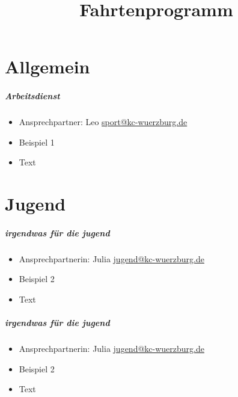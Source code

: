 \documentclass[12pt, a4paper]{report}
\title{Fahrtenprogramm}
\date{}
\begin{document}
\begingroup
    \hypersetup{hidelinks}
    \tableofcontents\thispagestyle{fancy}
\endgroup
\reversemarginpar

\chapter*{Allgemein}
\thispagestyle{Allgemein}
\pagestyle{Allgemein}
\paragraph{Arbeitsdienst}
\begin{itemize}
    \item Ansprechpartner: Leo \href{mailto:sport@kc-wuerzburg.de}{sport@kc-wuerzburg.de}
    \item Beispiel 1
    \item Text
\end{itemize}


\chapter*{Jugend}
\thispagestyle{Jugend}
\pagestyle{Jugend}
\paragraph{irgendwas für die jugend}
\begin{itemize}
    \item Ansprechpartnerin: Julia \href{mailto:jugend@kc-wuerzburg.de}{jugend@kc-wuerzburg.de}
    \item Beispiel 2
    \item Text
\end{itemize}

\paragraph{irgendwas für die jugend}
\begin{itemize}
    \item Ansprechpartnerin: Julia \href{mailto:jugend@kc-wuerzburg.de}{jugend@kc-wuerzburg.de}
    \item Beispiel 2
    \item Text
\end{itemize}
\end{document}
